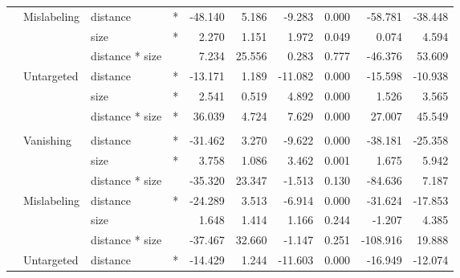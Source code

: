 \documentclass[
]{article}
\begin{document}
\begin{longtable}[t]{llllrrrrrr}
\cmidrule{2-10}\nopagebreak
\hspace{1em} & Mislabeling & distance & * & -48.140 & 5.186 & -9.283 & 0.000 & -58.781 & -38.448\\
\cmidrule{3-10}\nopagebreak
\hspace{1em} &  & size & * & 2.270 & 1.151 & 1.972 & 0.049 & 0.074 & 4.594\\
\cmidrule{3-10}\nopagebreak
\hspace{1em} &  & distance * size &  & 7.234 & 25.556 & 0.283 & 0.777 & -46.376 & 53.609\\
\cmidrule{2-10}\nopagebreak
\hspace{1em} & Untargeted & distance & * & -13.171 & 1.189 & -11.082 & 0.000 & -15.598 & -10.938\\
\cmidrule{3-10}\nopagebreak
\hspace{1em} &  & size & * & 2.541 & 0.519 & 4.892 & 0.000 & 1.526 & 3.565\\
\cmidrule{3-10}\nopagebreak
\hspace{1em} &  & distance * size & * & 36.039 & 4.724 & 7.629 & 0.000 & 27.007 & 45.549\\
\cmidrule{1-10}\pagebreak[0]
\addlinespace[0.3em]
\multicolumn{10}{l}{\textbf{Faster R-CNN}}\\
\hspace{1em} & Vanishing & distance & * & -31.462 & 3.270 & -9.622 & 0.000 & -38.181 & -25.358\\
\cmidrule{3-10}\nopagebreak
\hspace{1em} &  & size & * & 3.758 & 1.086 & 3.462 & 0.001 & 1.675 & 5.942\\
\cmidrule{3-10}\nopagebreak
\hspace{1em} &  & distance * size &  & -35.320 & 23.347 & -1.513 & 0.130 & -84.636 & 7.187\\
\cmidrule{2-10}\nopagebreak
\hspace{1em} & Mislabeling & distance & * & -24.289 & 3.513 & -6.914 & 0.000 & -31.624 & -17.853\\
\cmidrule{3-10}\nopagebreak
\hspace{1em} &  & size &  & 1.648 & 1.414 & 1.166 & 0.244 & -1.207 & 4.385\\
\cmidrule{3-10}\nopagebreak
\hspace{1em} &  & distance * size &  & -37.467 & 32.660 & -1.147 & 0.251 & -108.916 & 19.888\\
\cmidrule{2-10}\nopagebreak
\hspace{1em} & Untargeted & distance & * & -14.429 & 1.244 & -11.603 & 0.000 & -16.949 & -12.074\\

\end{longtable}
\end{document}
